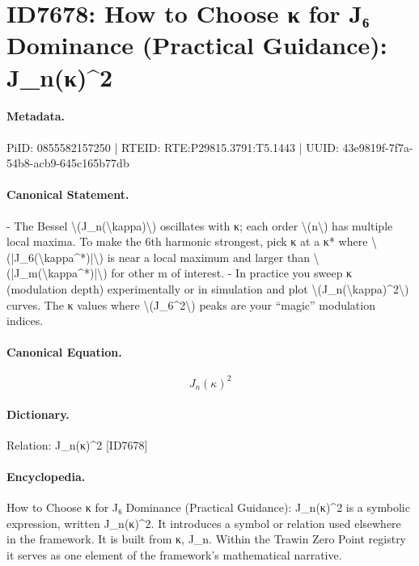 \section*{ID7678: How to Choose κ for J₆ Dominance (Practical Guidance): J\_n(κ)\textasciicircum{}2}
\paragraph{Metadata.}
PiID: 0855582157250 | RTEID: RTE:P29815.3791:T5.1443 | UUID: 43e9819f-7f7a-54b8-acb9-645c165b77db

\paragraph{Canonical Statement.}
- The Bessel \textbackslash{}(J\_n(\textbackslash{}kappa)\textbackslash{}) oscillates with κ; each order \textbackslash{}(n\textbackslash{}) has multiple local maxima. To make the 6th harmonic strongest, pick κ at a κ* where \textbackslash{}(|J\_6(\textbackslash{}kappa\textasciicircum{}*)|\textbackslash{}) is near a local maximum and larger than \textbackslash{}(|J\_m(\textbackslash{}kappa\textasciicircum{}*)|\textbackslash{}) for other m of interest. - In practice you sweep κ (modulation depth) experimentally or in simulation and plot \textbackslash{}(J\_n(\textbackslash{}kappa)\textasciicircum{}2\textbackslash{}) curves. The κ values where \textbackslash{}(J\_6\textasciicircum{}2\textbackslash{}) peaks are your “magic” modulation indices.

\paragraph{Canonical Equation.}
\[
J_n(\kappa)^2
\]

\paragraph{Dictionary.}
Relation: J\_n(κ)\textasciicircum{}2 [ID7678]

\paragraph{Encyclopedia.}
How to Choose κ for J₆ Dominance (Practical Guidance): J\_n(κ)\textasciicircum{}2 is a symbolic expression, written J\_n(κ)\textasciicircum{}2. It introduces a symbol or relation used elsewhere in the framework. It is built from κ, J\_n. Within the Trawin Zero Point registry it serves as one element of the framework's mathematical narrative.
